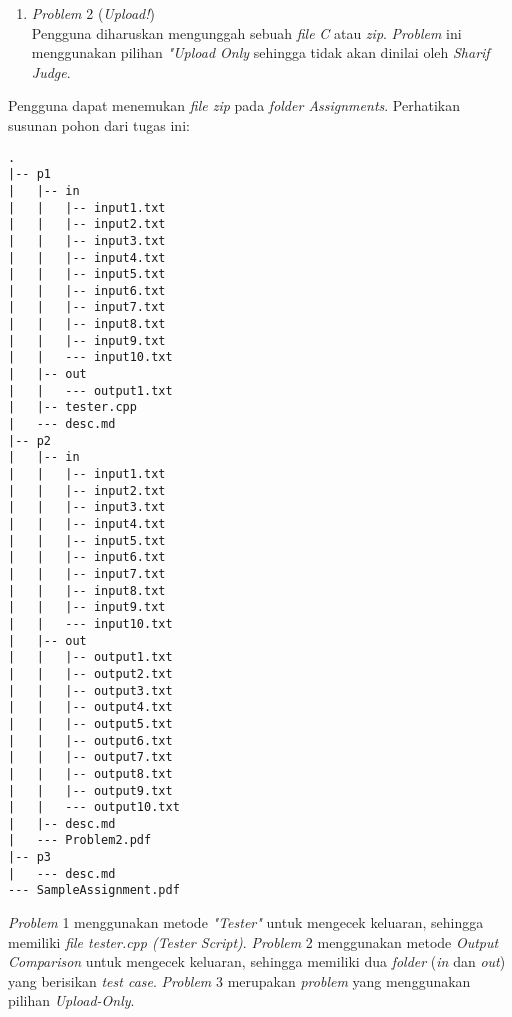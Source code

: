 \begin{enumerate}
\begin{table}[H]
\begin{tabular}{|c|c|}
			\hline
			
		\end{tabular} 
	\end{table}
	
	\item \textit{Problem} 2 (\textit{Upload!}) \\
	Pengguna diharuskan mengunggah sebuah \textit{file} \textit{C} atau \textit{zip}. \textit{Problem} ini menggunakan pilihan \textit{"Upload Only} sehingga tidak akan dinilai oleh \textit{Sharif Judge}.
\end{enumerate}

Pengguna dapat menemukan \textit{file zip} pada \textit{folder Assignments}. Perhatikan susunan pohon dari tugas ini:
\begin{lstlisting}[basicstyle=\ttfamily, frame=single,
columns=fullflexible, keepspaces=true, breaklines=true]
.
|-- p1
|   |-- in
|   |   |-- input1.txt
|   |   |-- input2.txt
|   |   |-- input3.txt
|   |   |-- input4.txt
|   |   |-- input5.txt
|   |   |-- input6.txt
|   |   |-- input7.txt
|   |   |-- input8.txt
|   |   |-- input9.txt
|   |   --- input10.txt
|   |-- out
|   |   --- output1.txt
|   |-- tester.cpp
|   --- desc.md
|-- p2
|   |-- in
|   |   |-- input1.txt
|   |   |-- input2.txt
|   |   |-- input3.txt
|   |   |-- input4.txt
|   |   |-- input5.txt
|   |   |-- input6.txt
|   |   |-- input7.txt
|   |   |-- input8.txt
|   |   |-- input9.txt
|   |   --- input10.txt
|   |-- out
|   |   |-- output1.txt
|   |   |-- output2.txt
|   |   |-- output3.txt
|   |   |-- output4.txt
|   |   |-- output5.txt
|   |   |-- output6.txt
|   |   |-- output7.txt
|   |   |-- output8.txt
|   |   |-- output9.txt
|   |   --- output10.txt
|   |-- desc.md
|   --- Problem2.pdf
|-- p3
|   --- desc.md
--- SampleAssignment.pdf
\end{lstlisting}
\textit{Problem} 1 menggunakan metode \textit{"Tester"} untuk mengecek keluaran, sehingga memiliki \textit{file tester.cpp (Tester Script)}. \textit{Problem} 2 menggunakan metode \textit{Output Comparison} untuk mengecek keluaran, sehingga memiliki dua \textit{folder} (\textit{in} dan \textit{out}) yang berisikan \textit{test case}. \textit{Problem} 3 merupakan \textit{problem} yang menggunakan pilihan \textit{Upload-Only}.

